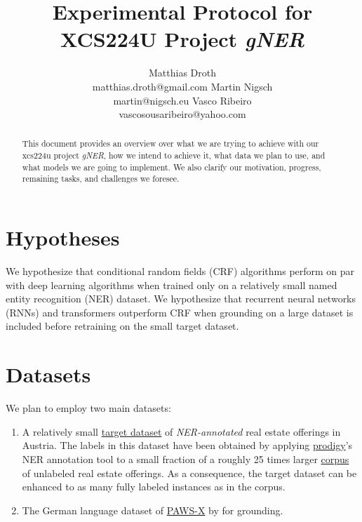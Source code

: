 \documentclass[11pt]{article}
\title{Experimental Protocol for XCS224U Project \emph{gNER}}
\author{
	Matthias Droth\\
	matthias.droth@gmail.com
	\And
	Martin Nigsch\\
	martin@nigsch.eu
	\And
	Vasco Ribeiro\\
	vascosousaribeiro@yahoo.com
}
\begin{document}
\maketitle

\begin{abstract}
This document provides an overview over what we are trying to achieve with our xcs224u project \emph{gNER}, how we intend to achieve it, what data we plan to use, and what models we are going to implement. We also clarify our motivation, progress, remaining tasks, and challenges we foresee.
\end{abstract}

\section{Hypotheses}
We hypothesize that conditional random fields (CRF) algorithms \citep{laffertyCrf, mccallum-li-2003-early, MAL-013} perform on par with deep learning algorithms when trained only on a relatively small named entity recognition (NER) dataset. We hypothesize that recurrent neural networks (RNNs) \citep{Tutschku95recurrentmultilayer, hochreiter1997long} and transformers \citep{NIPS2017_3f5ee243, rush-2018-annotated, devlin-etal-2019-bert} outperform CRF when grounding on a large dataset is included before retraining on the small target dataset.

\section{Datasets}
We plan to employ two main datasets:
\begin{enumerate}
    \item A relatively small \href{https://github.com/trugoj/cs224u/blob/main/base_data/annotations.jsonl}{target dataset} of \emph{NER-annotated} real estate offerings in Austria. The labels in this dataset have been obtained by applying \href{https://prodi.gy/}{prodigy}'s NER annotation tool to a small fraction of a roughly 25 times larger \href{https://raw.githubusercontent.com/trugoj/cs224u/main/base_data/data.jsonl}{corpus} of unlabeled real estate offerings. As a consequence, the target dataset can be enhanced to as many fully labeled instances as in the corpus.
    \item The German language dataset of \href{https://github.com/google-research-datasets/paws}{PAWS-X} by \citet{pawsx2019emnlp} for grounding.
\end{enumerate}
\end{document}

